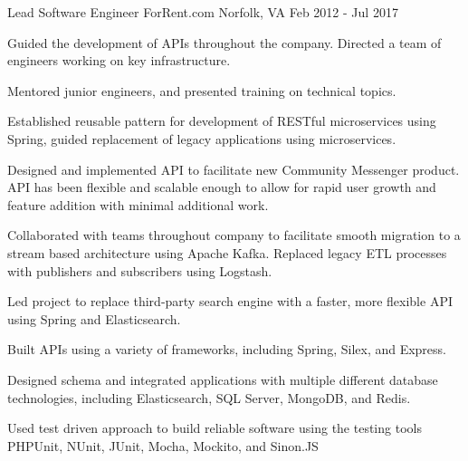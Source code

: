 \begin{cventries}
  \cventry
  {Lead Software Engineer} %
  {ForRent.com} %
  {Norfolk, VA} %
  {Feb 2012 - Jul 2017} %
  {
    \begin{cvitems} %
      \item {Guided the development of APIs throughout the company. Directed a
      team of engineers working on key infrastructure.}
      \item {Mentored junior engineers, and presented training on technical
      topics.}
      \item {Established reusable pattern for development of RESTful
      microservices using Spring, guided replacement of legacy applications
      using microservices.}
      \item {Designed and implemented API to facilitate new Community Messenger
      product. API has been flexible and scalable enough to allow for rapid user
      growth and feature addition with minimal additional work.}
      \item {Collaborated with teams throughout company to facilitate smooth
      migration to a stream based architecture using Apache Kafka. Replaced
      legacy ETL processes with publishers and subscribers using Logstash.}
      \item {Led project to replace third-party search engine with a faster,
      more flexible API using Spring and Elasticsearch.}
      \item {Built APIs using a variety of frameworks, including Spring, Silex,
      and Express.}
      \item {Designed schema and integrated applications with multiple different
      database technologies, including Elasticsearch, SQL Server, MongoDB, and
      Redis.}
      \item {Used test driven approach to build reliable software using the
      testing tools PHPUnit, NUnit, JUnit, Mocha, Mockito, and Sinon.JS}
    \end{cvitems}
  }


\end{cventries}
